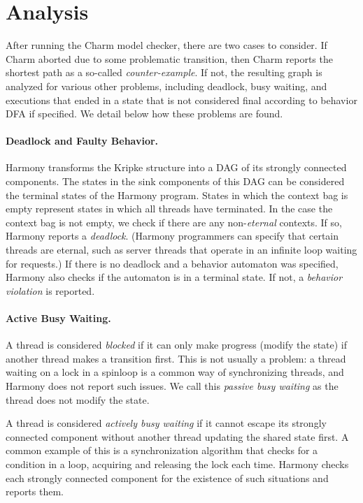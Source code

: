\documentclass[twocolumn]{article}
\begin{document}
\section{Analysis}

After running the Charm model checker, there are two cases to
consider.  If Charm aborted due to some problematic transition,
then Charm reports the shortest path as a so-called \emph{counter-example}.
If not, the resulting graph is analyzed for various other problems,
including deadlock, busy waiting, and executions
that ended in a state that is not considered final according to
behavior DFA if specified.  We detail below how these problems are
found.

\paragraph{Deadlock and Faulty Behavior.}

Harmony transforms the Kripke structure into a DAG of its strongly
connected components.  The states in the sink components of this
DAG can be considered the terminal states of the Harmony program.
States in which the context bag is empty represent states in which
all threads have terminated.  In the case the context bag is not
empty, we check if there are any non-\emph{eternal} contexts.  If
so, Harmony reports a \emph{deadlock}.  (Harmony programmers can
specify that certain threads are eternal, such as server threads
that operate in an infinite loop waiting for requests.) If there
is no deadlock and a behavior automaton was specified, Harmony also
checks if the automaton is in a terminal state.  If not, a
\emph{behavior violation} is reported.

\paragraph{Active Busy Waiting.}

A thread is considered \emph{blocked} if it can only make progress
(modify the state) if another thread makes a transition first.
This is not usually a problem: a thread waiting on a lock in a spinloop
is a common way of synchronizing threads, and Harmony does not report
such issues.  We call this \emph{passive busy waiting} as the thread
does not modify the state.

A thread is considered \emph{actively busy waiting} if it cannot
escape its strongly connected component without another thread
updating the shared state first.  A common example of this is a
synchronization algorithm that checks for a condition in a loop,
acquiring and releasing the lock each time.  Harmony checks each
strongly connected component for the existence of such situations
and reports them.
\end{document}
